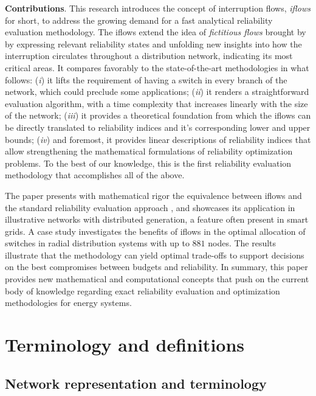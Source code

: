 \textbf{Contributions}. This research introduces the concept of interruption flows, \textit{iflows} for short, to address the growing demand for a fast analytical reliability evaluation methodology.
The iflows extend the idea of \textit{fictitious flows} brought by \cite{LiEtAl2020b} by expressing relevant reliability states and unfolding new insights into how the interruption circulates throughout a distribution network, indicating its most critical areas. It compares favorably to the state-of-the-art methodologies  in what follows: (\textit{i}) it lifts the requirement of having a switch in every branch of the network, which could preclude some applications; (\textit{ii}) it renders a straightforward evaluation algorithm, with a time complexity that increases linearly with the size of the network; (\textit{iii}) it provides a theoretical foundation from which the iflows can be directly translated to reliability indices and it's corresponding lower and upper bounds; (\textit{iv}) and foremost, it provides linear descriptions of reliability indices that allow strengthening the mathematical formulations of reliability optimization problems. To the best of our knowledge, this is the first reliability evaluation methodology that accomplishes all of the above.

The paper presents with mathematical rigor the equivalence between iflows and the standard reliability evaluation approach \cite{billinton}, and showcases its application in illustrative networks with distributed generation, a feature often present in smart grids. A case study investigates the benefits of iflows in the optimal allocation of switches in radial distribution systems with up to $881$ nodes.
The results illustrate that the methodology can yield optimal trade-offs to support decisions on the best compromises between budgets and reliability. In summary, this paper provides new mathematical and computational concepts that push on the current body of knowledge regarding exact reliability evaluation and optimization methodologies for energy systems.



\section{Terminology and definitions} \label{sec:Terminology}

\subsection{Network representation and terminology} \label{sec:mainConcepts}

